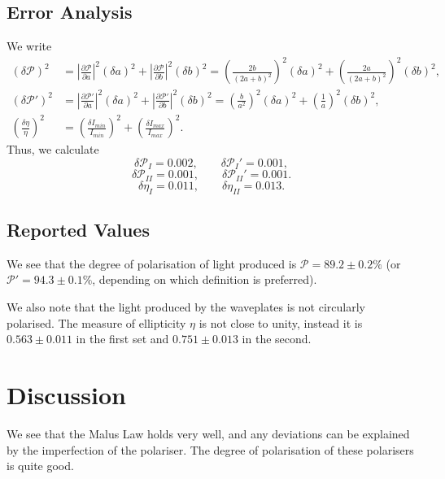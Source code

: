 \documentclass[11pt]{article}
\newcommand\pp[2]{\frac{\partial #1}{\partial #2}}
\begin{document}
        \subsection{Error Analysis}
        We write
        \begin{align*}
                (\delta\mathcal{P})^2 &= \left|\pp{\mathcal{P}}{a}\right|^2(\delta a)^2 + \left|\pp{\mathcal{P}}{b}\right|^2(\delta b)^2
                        = \left(\frac{2b}{(2a + b)^2}\right)^2 (\delta a)^2 + \left(\frac{2a}{(2a + b)^2}\right)^2(\delta b)^2, \\
                (\delta\mathcal{P}')^2 &= \left|\pp{\mathcal{P}'}{a}\right|^2(\delta a)^2 + \left|\pp{\mathcal{P}'}{b}\right|^2(\delta b)^2
                        = \left(\frac{b}{a^2}\right)^2 (\delta a)^2 + \left(\frac{1}{a}\right)^2(\delta b)^2, \\
                \left(\frac{\delta \eta}{\eta}\right)^2 &= \left(\frac{\delta I_{min}}{I_{min}}\right)^2 + \left(\frac{\delta I_{max}}{I_{max}}\right)^2.
        \end{align*}
        Thus, we calculate
        \[
                \delta\mathcal{P}_{I} = 0.002, \qquad \delta\mathcal{P}_{I}' = 0.001,
        \]
        \[
                \delta\mathcal{P}_{II} = 0.001, \qquad \delta\mathcal{P}_{II}' = 0.001.
        \]
        \[
                \delta\eta_{I} = 0.011, \qquad \delta\eta_{II} = 0.013.
        \]

        \subsection{Reported Values}
        We see that the degree of polarisation of light produced is $\mathcal{P} = 89.2 \pm 0.2\%$ (or $\mathcal{P}' = 94.3 \pm 0.1\%$, 
        depending on which definition is preferred). 

        We also note that the light produced by the waveplates is not circularly polarised. The measure of ellipticity $\eta$ is not close
        to unity, instead it is $0.563 \pm 0.011$ in the first set and $0.751 \pm 0.013$ in the second.

        \section{Discussion}
        We see that the Malus Law holds very well, and any deviations can be explained by the imperfection of the polariser.
        The degree of polarisation of these polarisers is quite good.
\end{document}
